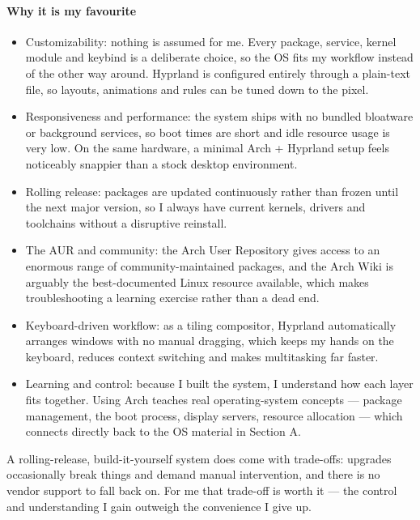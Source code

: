 \documentclass[a4paper,12pt]{article}
\begin{document}
\paragraph{Why it is my favourite}
\begin{itemize}
    \item Customizability: nothing is assumed for me. Every package, service, kernel module and keybind is a deliberate choice, so the OS fits my workflow instead of the other way around. Hyprland is configured entirely through a plain-text file, so layouts, animations and rules can be tuned down to the pixel.
    \item Responsiveness and performance: the system ships with no bundled bloatware or background services, so boot times are short and idle resource usage is very low. On the same hardware, a minimal Arch + Hyprland setup feels noticeably snappier than a stock desktop environment.
    \item Rolling release: packages are updated continuously rather than frozen until the next major version, so I always have current kernels, drivers and toolchains without a disruptive reinstall.
    \item The AUR and community: the Arch User Repository gives access to an enormous range of community-maintained packages, and the Arch Wiki is arguably the best-documented Linux resource available, which makes troubleshooting a learning exercise rather than a dead end.
    \item Keyboard-driven workflow: as a tiling compositor, Hyprland automatically arranges windows with no manual dragging, which keeps my hands on the keyboard, reduces context switching and makes multitasking far faster.
    \item Learning and control: because I built the system, I understand how each layer fits together. Using Arch teaches real operating-system concepts — package management, the boot process, display servers, resource allocation — which connects directly back to the OS material in Section A.
\end{itemize}
A rolling-release, build-it-yourself system does come with trade-offs: upgrades occasionally break things and demand manual intervention, and there is no vendor support to fall back on. For me that trade-off is worth it — the control and understanding I gain outweigh the convenience I give up.
\end{document}
